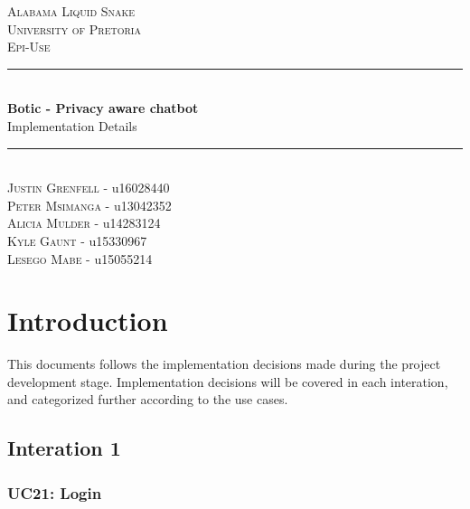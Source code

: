 \documentclass[11pt]{article}
\begin{document}
\renewcommand{\familydefault}{\sfdefault}
\begin{titlepage}
	\newcommand{\HRule}{\rule{\linewidth}{0.5mm}}
	\begin{center}
		            
		\textsc{\LARGE Alabama Liquid Snake}\\[0.8cm]
		\textsc{\Large University of Pretoria}\\[0.5cm]
		\textsc{\large Epi-Use}\\[0.5cm]
		    
		\HRule\\[0.4cm]
		    	
		{\huge\bfseries Botic - Privacy aware chatbot}\\[0.2cm]
		    	
		{\huge Implementation Details}\\[0.2cm]
		
		\HRule\\[0.5cm]
		
		\textsc{Justin Grenfell} - u16028440 \\[0cm]
		\textsc{Peter Msimanga} - u13042352 \\[0cm]
		\textsc{Alicia Mulder} - u14283124 \\[0cm]
		\textsc{Kyle Gaunt} - u15330967 \\[0cm]
		\textsc{Lesego Mabe} - u15055214 \\[0cm]
		    
	\end{center}
\end{titlepage}
\tableofcontents
\newpage

\section{Introduction}

This documents follows the implementation decisions made during the project development stage. Implementation decisions will be covered in each interation, and categorized further according to the use cases.

\subsection{Interation 1}

\subsubsection{UC21: Login}
\end{document}
